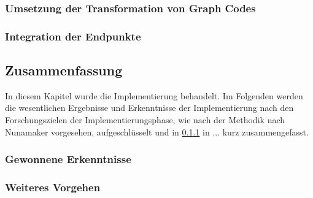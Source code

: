 \subsubsection{Umsetzung der Transformation von Graph Codes}
\label{sec4:impl:subsubsec:gc-transformation}

\subsubsection{Integration der Endpunkte}
\label{sec4:impl:par:endpoint-integration}

\clearpage

\subsection{Zusammenfassung}
\label{sec4:impl:subsec:summary}
In diesem Kapitel wurde die Implementierung behandelt.
Im Folgenden werden die wesentlichen Ergebnisse und Erkenntnisse der Implementierung nach den Forschungszielen der Implementierungsphase, wie nach der Methodik nach Nunamaker vorgesehen, aufgeschlüsselt und in \cref{sec4:impl:subsubsec:summary-findings} in ... kurz zusammengefasst.

\subsubsection{Gewonnene Erkenntnisse}
\label{sec4:impl:subsubsec:summary-findings}

\subsubsection{Weiteres Vorgehen}
\label{sec4:impl:subsubsec:further-approach}


